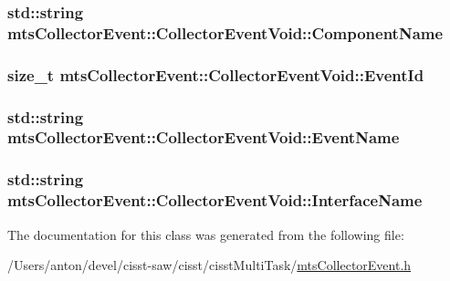 \subsubsection[{Component\+Name}]{\setlength{\rightskip}{0pt plus 5cm}std\+::string mts\+Collector\+Event\+::\+Collector\+Event\+Void\+::\+Component\+Name}\label{classmts_collector_event_1_1_collector_event_void_af7494d63892c827f73543dadcc919df7}
\hypertarget{classmts_collector_event_1_1_collector_event_void_a50253a8a23a0e44f3da25bbf006a544b}{}
\subsubsection[{Event\+Id}]{\setlength{\rightskip}{0pt plus 5cm}size\+\_\+t mts\+Collector\+Event\+::\+Collector\+Event\+Void\+::\+Event\+Id}\label{classmts_collector_event_1_1_collector_event_void_a50253a8a23a0e44f3da25bbf006a544b}
\hypertarget{classmts_collector_event_1_1_collector_event_void_a5519a90042bb42041e6aea5e4859952c}{}
\subsubsection[{Event\+Name}]{\setlength{\rightskip}{0pt plus 5cm}std\+::string mts\+Collector\+Event\+::\+Collector\+Event\+Void\+::\+Event\+Name}\label{classmts_collector_event_1_1_collector_event_void_a5519a90042bb42041e6aea5e4859952c}
\hypertarget{classmts_collector_event_1_1_collector_event_void_a40cc93e11bb1411b32e608030473939d}{}
\subsubsection[{Interface\+Name}]{\setlength{\rightskip}{0pt plus 5cm}std\+::string mts\+Collector\+Event\+::\+Collector\+Event\+Void\+::\+Interface\+Name}\label{classmts_collector_event_1_1_collector_event_void_a40cc93e11bb1411b32e608030473939d}


The documentation for this class was generated from the following file\+:\begin{DoxyCompactItemize}
\item 
/\+Users/anton/devel/cisst-\/saw/cisst/cisst\+Multi\+Task/\hyperlink{mts_collector_event_8h}{mts\+Collector\+Event.\+h}\end{DoxyCompactItemize}
